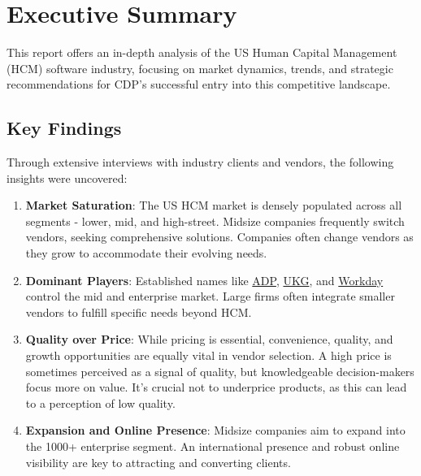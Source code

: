 \documentclass[
  a4paper,
]{book}
\renewcommand*\contentsname{Table of contents}
\newcommand\contentsname{Table of contents}
\renewcommand{\labelenumi}{\textbf{\textcolor{com-color}{\arabic*.}}}%
\begin{document}
\ifdefined\Shaded\renewenvironment{Shaded}{\begin{tcolorbox}[borderline west={3pt}{0pt}{shadecolor}, sharp corners, interior hidden, boxrule=0pt, frame hidden, enhanced, breakable]}{\end{tcolorbox}}\fi

\renewcommand*\contentsname{Table of contents}
{
\setcounter{tocdepth}{2}
\tableofcontents
}
\mainmatter
\hypertarget{executive-summary}{%
\chapter{Executive Summary}\label{executive-summary}}

This report offers an in-depth analysis of the US Human Capital
Management (HCM) software industry, focusing on market dynamics, trends,
and strategic recommendations for CDP's successful entry into this
competitive landscape.

\hypertarget{key-findings}{%
\section{Key Findings}\label{key-findings}}

Through extensive interviews with industry clients and vendors, the
following insights were uncovered:

\begin{enumerate}
\def\labelenumi{\arabic{enumi}.}
\item
  \textbf{Market Saturation}: The US HCM market is densely populated
  across all segments - lower, mid, and high-street. Midsize companies
  frequently switch vendors, seeking comprehensive solutions. Companies
  often change vendors as they grow to accommodate their evolving needs.
\item
  \textbf{Dominant Players}: Established names like
  \href{https://www.adp.com/}{ADP}, \href{https://www.ukg.com/}{UKG},
  and \href{https://www.workday.com/}{Workday} control the mid and
  enterprise market. Large firms often integrate smaller vendors to
  fulfill specific needs beyond HCM.
\item
  \textbf{Quality over Price}: While pricing is essential, convenience,
  quality, and growth opportunities are equally vital in vendor
  selection. A high price is sometimes perceived as a signal of quality,
  but knowledgeable decision-makers focus more on value. It's crucial
  not to underprice products, as this can lead to a perception of low
  quality.
\item
  \textbf{Expansion and Online Presence}: Midsize companies aim to
  expand into the 1000+ enterprise segment. An international presence
  and robust online visibility are key to attracting and converting
  clients.
\end{enumerate}
\end{document}

